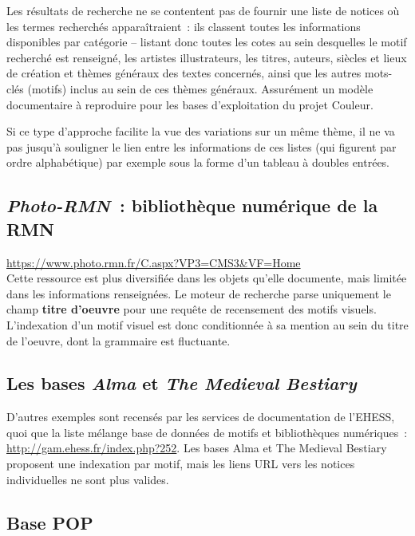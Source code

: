 \documentclass[a4paper,12pt, twoside]{book}
\begin{document}
Les résultats de recherche ne se contentent pas de fournir une liste de notices où les termes recherchés apparaîtraient~: ils classent toutes les informations disponibles par catégorie – listant donc toutes les cotes au sein desquelles le motif recherché est renseigné, les artistes illustrateurs, les titres, auteurs, siècles et lieux de création et thèmes généraux des textes concernés, ainsi que les autres mots-clés (motifs) inclus au sein de ces thèmes généraux. Assurément un modèle documentaire à reproduire pour les bases d’exploitation du projet Couleur.

Si ce type d’approche facilite la vue des variations sur un même thème, il ne va pas jusqu’à souligner le lien entre les informations de ces listes (qui figurent par ordre alphabétique) par exemple sous la forme d’un tableau à doubles entrées.

\subsection*{\textit{Photo-RMN}~: bibliothèque numérique de la RMN}

\url{https://www.photo.rmn.fr/C.aspx?VP3=CMS3&VF=Home}\\

Cette ressource est plus diversifiée dans les objets qu’elle documente, mais limitée dans les informations renseignées. Le moteur de recherche parse uniquement le champ \textbf{titre d’oeuvre} pour une requête de recensement des motifs visuels. L’indexation d’un motif visuel est donc conditionnée à sa mention au sein du titre de l’oeuvre, dont la grammaire est fluctuante.

\subsection*{Les bases \textit{Alma} et \textit{The Medieval Bestiary}}

D’autres exemples sont recensés par les services de documentation de l’EHESS, quoi que la liste mélange base de données de motifs et bibliothèques numériques~: \url{http://gam.ehess.fr/index.php?252}. Les bases Alma et The Medieval Bestiary proposent une indexation par motif, mais les liens URL vers les notices individuelles ne sont plus valides.

\subsection*{Base POP}
\end{document}
